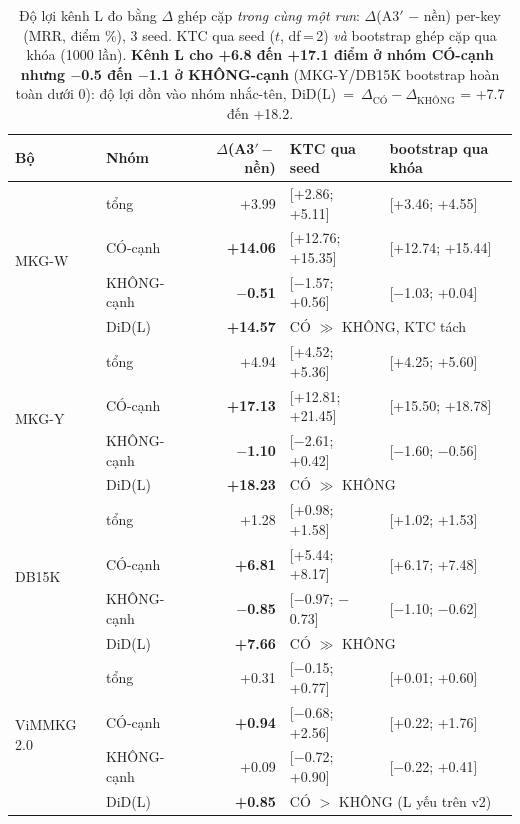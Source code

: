 \begin{table}[t]
\centering
\footnotesize
\setlength{\tabcolsep}{4pt}
\caption{Độ lợi kênh L đo bằng $\Delta$ ghép cặp \emph{trong cùng một run}: $\Delta$(A3$'$ $-$ nền)
per-key (MRR, điểm \%), 3 seed. KTC qua seed ($t$, df\,=\,2) \emph{và} bootstrap ghép cặp qua khóa
(1000 lần). \textbf{Kênh L cho +6.8 đến +17.1 điểm ở nhóm CÓ-cạnh nhưng $-$0.5 đến $-$1.1 ở
KHÔNG-cạnh} (MKG-Y/DB15K bootstrap hoàn toàn dưới 0): độ lợi dồn vào nhóm nhắc-tên,
DiD(L)~=~$\Delta_{\text{CÓ}}-\Delta_{\text{KHÔNG}}$ = +7.7 đến +18.2.}
\label{tab:delta_L}
\begin{tabular}{l l r l l}
\toprule
Bộ & Nhóm & $\Delta$(A3$'-$nền) & KTC qua seed & bootstrap qua khóa \\
\midrule
\multirow{4}{*}{MKG-W} & tổng & +3.99 & [+2.86; +5.11] & [+3.46; +4.55] \\
 & CÓ-cạnh & \textbf{+14.06} & [+12.76; +15.35] & [+12.74; +15.44] \\
 & KHÔNG-cạnh & \textbf{$-$0.51} & [$-$1.57; +0.56] & [$-$1.03; +0.04] \\
 & DiD(L) & \textbf{+14.57} & \multicolumn{2}{l}{CÓ $\gg$ KHÔNG, KTC tách} \\
\midrule
\multirow{4}{*}{MKG-Y} & tổng & +4.94 & [+4.52; +5.36] & [+4.25; +5.60] \\
 & CÓ-cạnh & \textbf{+17.13} & [+12.81; +21.45] & [+15.50; +18.78] \\
 & KHÔNG-cạnh & \textbf{$-$1.10} & [$-$2.61; +0.42] & [$-$1.60; $-$0.56] \\
 & DiD(L) & \textbf{+18.23} & \multicolumn{2}{l}{CÓ $\gg$ KHÔNG} \\
\midrule
\multirow{4}{*}{DB15K} & tổng & +1.28 & [+0.98; +1.58] & [+1.02; +1.53] \\
 & CÓ-cạnh & \textbf{+6.81} & [+5.44; +8.17] & [+6.17; +7.48] \\
 & KHÔNG-cạnh & \textbf{$-$0.85} & [$-$0.97; $-$0.73] & [$-$1.10; $-$0.62] \\
 & DiD(L) & \textbf{+7.66} & \multicolumn{2}{l}{CÓ $\gg$ KHÔNG} \\
\midrule
\multirow{4}{*}{ViMMKG 2.0} & tổng & +0.31 & [$-$0.15; +0.77] & [+0.01; +0.60] \\
 & CÓ-cạnh & \textbf{+0.94} & [$-$0.68; +2.56] & [+0.22; +1.76] \\
 & KHÔNG-cạnh & +0.09 & [$-$0.72; +0.90] & [$-$0.22; +0.41] \\
 & DiD(L) & \textbf{+0.85} & \multicolumn{2}{l}{CÓ $>$ KHÔNG (L yếu trên v2)} \\
\bottomrule
\end{tabular}


\end{table}
